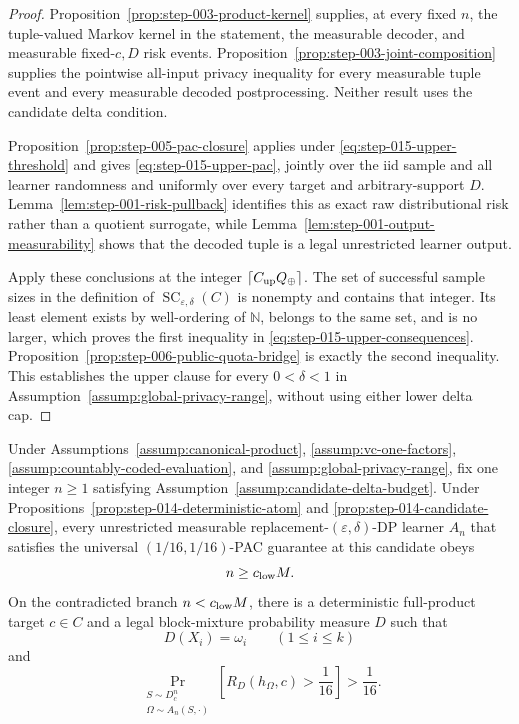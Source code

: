 \begin{proof}
Proposition~\ref{prop:step-003-product-kernel} supplies, at every fixed
\(n\), the tuple-valued Markov kernel in the statement, the measurable
decoder, and measurable fixed-\(c,D\) risk events.
Proposition~\ref{prop:step-003-joint-composition} supplies the pointwise
all-input privacy inequality for every measurable tuple event and
every measurable decoded postprocessing.  Neither result uses the
candidate delta condition.

Proposition~\ref{prop:step-005-pac-closure} applies under
\eqref{eq:step-015-upper-threshold} and gives
\eqref{eq:step-015-upper-pac}, jointly over the iid sample and all
learner randomness and uniformly over every target and
arbitrary-support \(D\).  Lemma~\ref{lem:step-001-risk-pullback}
identifies this as exact raw distributional risk rather than a quotient
surrogate, while
Lemma~\ref{lem:step-001-output-measurability} shows that the decoded
tuple is a legal unrestricted learner output.

Apply these conclusions at the integer
\(\lceil C_{\rm up}Q_\oplus\rceil\).  The set of successful sample
sizes in the definition of
\(\operatorname{SC}_{\varepsilon,\delta}(C)\) is nonempty and contains
that integer.  Its least element exists by well-ordering of
\(\mathbb N\), belongs to the same set, and is no larger, which proves
the first inequality in \eqref{eq:step-015-upper-consequences}.
Proposition~\ref{prop:step-006-public-quota-bridge} is exactly the
second inequality.  This establishes the upper clause for every
\(0<\delta<1\) in
Assumption~\ref{assump:global-privacy-range}, without using either
lower delta cap.
\end{proof}

\begin{proposition}
\label{prop:step-015-candidate-lower}
Under Assumptions~\ref{assump:canonical-product},
\ref{assump:vc-one-factors},
\ref{assump:countably-coded-evaluation}, and
\ref{assump:global-privacy-range}, fix one integer \(n\ge1\) satisfying
Assumption~\ref{assump:candidate-delta-budget}.  Under
Propositions~\ref{prop:step-014-deterministic-atom} and
\ref{prop:step-014-candidate-closure}, every unrestricted measurable
replacement-\((\varepsilon,\delta)\)-DP learner \(A_n\) that satisfies
the universal \((1/16,1/16)\)-PAC guarantee at this candidate obeys
\begin{equation}\label{eq:step-015-candidate-lower}
n\ge c_{\rm low}M.
\end{equation}
On the contradicted branch \(n<c_{\rm low}M\), there is a deterministic
full-product target \(c\in C\) and a legal block-mixture probability
measure \(D\) such that
\begin{equation}\label{eq:step-015-lower-witness-masses}
D(X_i)=\omega_i\qquad(1\le i\le k)
\end{equation}
and
\begin{equation}\label{eq:step-015-lower-witness-event}
\Pr_{\substack{S\sim D_c^n\\
                \Omega\sim A_n(S,\cdot)}}
\left[R_D(h_\Omega,c)>\frac1{16}\right]
>\frac1{16}.
\end{equation}
\end{proposition}


